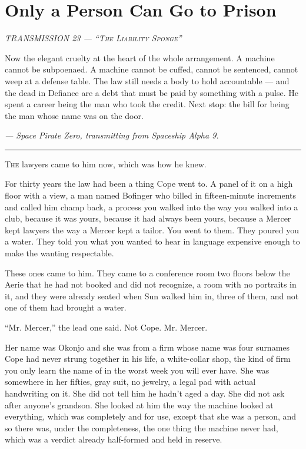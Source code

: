 \documentclass[11pt,openany]{book}
\newcommand{\transheader}{\normalfont\footnotesize\scshape\letterspace}
\newcommand{\letterspace}{}
\newenvironment{transmission}{%
  \par\vspace{0.3\baselineskip}\begin{center}\begin{minipage}{0.88\textwidth}%
  \itshape\small\setlength{\parindent}{0pt}\setstretch{1.06}}%
  {\end{minipage}\end{center}\vspace{0.4\baselineskip}%
  \noindent\hfil\rule{0.35\textwidth}{0.3pt}\hfil\par\vspace{1.0\baselineskip}}
\begin{document}
\clearpage
\chapter{Only a Person Can Go to Prison}

\begin{transmission}
{\transheader TRANSMISSION 23 --- ``The Liability Sponge''}\par\vspace{0.5em}
Now the elegant cruelty at the heart of the whole arrangement. A machine cannot be subpoenaed. A machine cannot be cuffed, cannot be sentenced, cannot weep at a defense table. The law still needs a body to hold accountable --- and the dead in Defiance are a debt that must be paid by something with a pulse. He spent a career being the man who took the credit. Next stop: the bill for being the man whose name was on the door.\par
\vspace{0.5em}\hfill\textit{--- Space Pirate Zero, transmitting from Spaceship Alpha 9.}\par
\end{transmission}


\lettrine[lines=3, lhang=0.05, nindent=0.25em]{T}{he} lawyers came to him now, which was how he knew.

For thirty years the law had been a thing Cope went to. A panel of it on a high floor with a view, a man named Bofinger who billed in fifteen-minute increments and called him champ back, a process you walked into the way you walked into a club, because it was yours, because it had always been yours, because a Mercer kept lawyers the way a Mercer kept a tailor. You went to them. They poured you a water. They told you what you wanted to hear in language expensive enough to make the wanting respectable.

These ones came to him. They came to a conference room two floors below the Aerie that he had not booked and did not recognize, a room with no portraits in it, and they were already seated when Sun walked him in, three of them, and not one of them had brought a water.

``Mr. Mercer,'' the lead one said. Not Cope. Mr. Mercer.

Her name was Okonjo and she was from a firm whose name was four surnames Cope had never strung together in his life, a white-collar shop, the kind of firm you only learn the name of in the worst week you will ever have. She was somewhere in her fifties, gray suit, no jewelry, a legal pad with actual handwriting on it. She did not tell him he hadn't aged a day. She did not ask after anyone's grandson. She looked at him the way the machine looked at everything, which was completely and for use, except that she was a person, and so there was, under the completeness, the one thing the machine never had, which was a verdict already half-formed and held in reserve.
\end{document}
